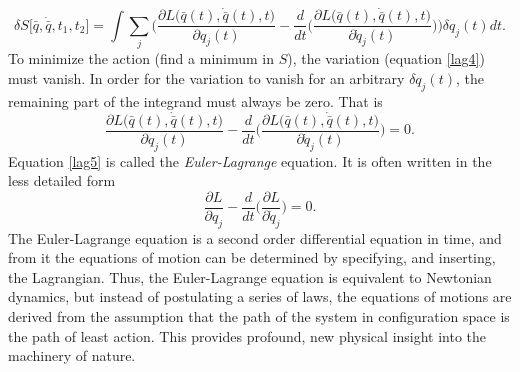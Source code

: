 \begin{equation}
	\delta S\big[\bar{q},\dot{\bar{q}}, t_1,t_2\big]=\int\sum_{j}\bigg(\frac{\partial L\big(\bar{q}(t),\dot{\bar{q}}(t),t\big)}{\partial q_j(t)}-\frac{d}{dt}\bigg(\frac{\partial L\big(\bar{q}(t),\dot{\bar{q}}(t),t\big)}{\partial \dot{q}_j(t)}\bigg) \bigg)\delta q_j(t)dt.
	\label{lag4}
\end{equation} 
To minimize the action (find a minimum in $S$), the variation (equation \eqref{lag4}) must vanish. In order for the variation to vanish for an arbitrary $\delta q_j(t)$, the remaining part of the integrand must always be zero. That is
\begin{equation}
	\frac{\partial L\big(\bar{q}(t),\dot{\bar{q}}(t),t\big)}{\partial q_j(t)}-\frac{d}{dt}\bigg(\frac{\partial L\big(\bar{q}(t),\dot{\bar{q}}(t),t\big)}{\partial \dot{q}_j(t)}\bigg)=0. 
	\label{lag5}
\end{equation} 
Equation \eqref{lag5} is called the \emph{Euler-Lagrange} equation. It is often written in the less detailed form
\begin{equation}
	\frac{\partial L}{\partial q_j}-\frac{d}{dt}\bigg(\frac{\partial L}{\partial \dot{q}_j}\bigg)=0. 
	\label{EL}
\end{equation} 
The Euler-Lagrange equation is a second order differential equation in time, and from it the equations of motion can be determined by specifying, and inserting, the Lagrangian. Thus, the Euler-Lagrange equation is equivalent to Newtonian dynamics, but instead of postulating a series of laws, the equations of motions are derived from the assumption that the path of the system in configuration space is the path of least action. This provides profound, new physical insight into the machinery of nature.

